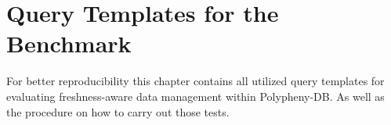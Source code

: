\chapter{Query Templates for the Benchmark}
For better reproducibility  this chapter contains all utilized query templates for evaluating freshness-aware data management within Polypheny-DB.
As well as the procedure on how to carry out those tests.